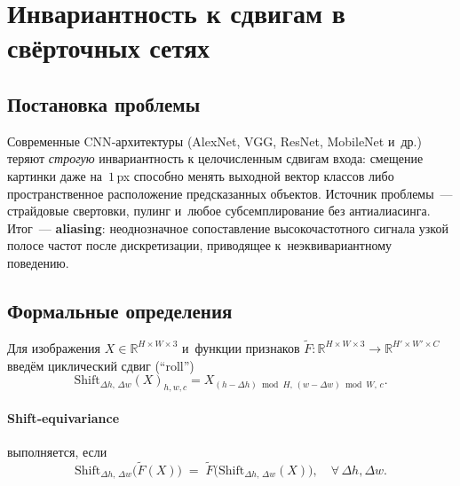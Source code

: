 

\section{Инвариантность к сдвигам в свёрточных сетях}
\label{sec:shift_invariance}

\subsection{Постановка проблемы}
Современные CNN‑архитектуры (AlexNet, VGG, ResNet, MobileNet и~др.) теряют \emph{строгую} инвариантность к целочисленным сдвигам входа: смещение картинки даже на~$1\,$px способно менять выходной вектор классов либо пространственное расположение предсказанных объектов. Источник проблемы — страйдовые свертовки, пулинг и~любое субсемплирование без антиалиасинга. Итог — \textbf{aliasing}: неоднозначное сопоставление высокочастотного сигнала узкой полосе частот после дискретизации, приводящее к неэквивариантному поведению.

\subsection{Формальные определения}
Для изображения $X \in \mathbb R^{H\times W\times3}$ и функции признаков $\tilde F: \mathbb R^{H\times W\times3} \to \mathbb R^{H'\times W'\times C}$ введём циклический сдвиг (``roll'')
\begin{equation}
\mathrm{Shift}_{\Delta h,\,\Delta w}(X)_{h, w, c} = X_{(h-\Delta h) \bmod H,\,(w-\Delta w) \bmod W,\, c}.
\end{equation}
\paragraph{Shift‑equivariance} выполняется, если
\begin{equation}
\mathrm{Shift}_{\Delta h,\,\Delta w}\bigl(\tilde F(X)\bigr) \;=\; \tilde F\bigl(\mathrm{Shift}_{\Delta h,\,\Delta w}(X)\bigr), \quad \forall\, \Delta h, \Delta w.\label{eq:eqv}
\end{equation}
